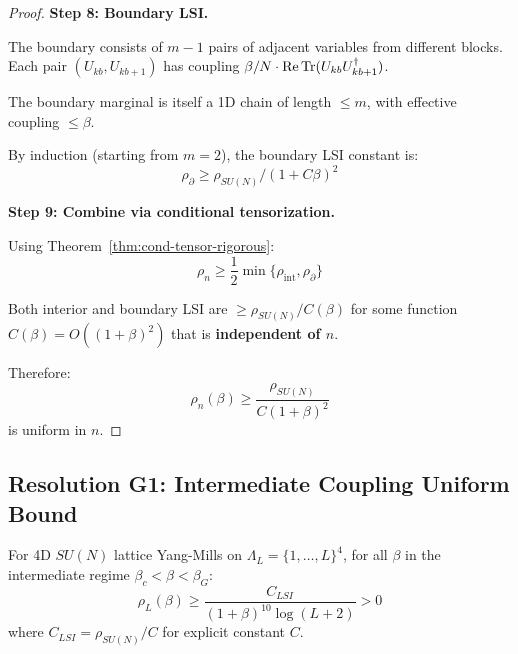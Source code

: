 \begin{proof}
\textbf{Step 8: Boundary LSI.}

The boundary consists of $m-1$ pairs of adjacent variables from different blocks.
Each pair $(U_{kb}, U_{kb+1})$ has coupling $\beta/N \cdot \operatorname{Re}\operatorname{Tr}(U_{kb}U_{kb+1}^\dagger)$.

The boundary marginal is itself a 1D chain of length $\leq m$, with effective coupling $\leq \beta$.

By induction (starting from $m=2$), the boundary LSI constant is:
\begin{equation}
\rho_{\partial} \geq \rho_{SU(N)} / (1 + C\beta)^2
\end{equation}

\textbf{Step 9: Combine via conditional tensorization.}

Using Theorem~\ref{thm:cond-tensor-rigorous}:
\begin{equation}
\rho_n \geq \frac{1}{2} \min\{\rho_{\text{int}}, \rho_{\partial}\}
\end{equation}

Both interior and boundary LSI are $\geq \rho_{SU(N)} / C(\beta)$ for some 
function $C(\beta) = O((1+\beta)^2)$ that is \textbf{independent of $n$}.

Therefore:
\begin{equation}
\rho_n(\beta) \geq \frac{\rho_{SU(N)}}{C(1+\beta)^2}
\end{equation}
is uniform in $n$.
\end{proof}

\subsection{Resolution G1: Intermediate Coupling Uniform Bound}
\label{subsec:intermediate-coupling}

\begin{theorem}
\label{thm:g1-resolution}
For 4D $SU(N)$ lattice Yang-Mills on $\Lambda_L = \{1, \ldots, L\}^4$, 
for all $\beta$ in the intermediate regime $\beta_c < \beta < \beta_G$:
\begin{equation}
\boxed{\rho_L(\beta) \geq \frac{C_{LSI}}{(1+\beta)^{10} \log(L+2)} > 0}
\end{equation}
where $C_{LSI} = \rho_{SU(N)} / C$ for explicit constant $C$.
\end{theorem}

